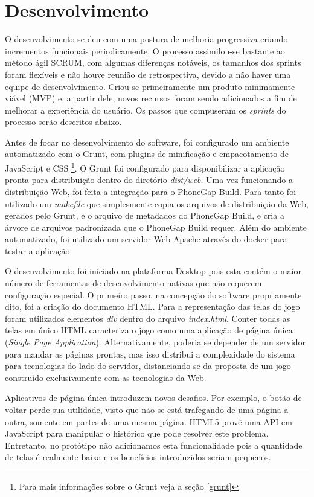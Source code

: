 \section{Desenvolvimento}

O desenvolvimento se deu com uma postura de melhoria progressiva criando
incrementos funcionais periodicamente. O processo assimilou-se bastante
ao método ágil SCRUM, com algumas diferenças notáveis, os tamanhos dos sprints
foram flexíveis e não houve reunião de retrospectiva, devido a não
haver uma equipe de desenvolvimento. Criou-se primeiramente um produto
minimamente viável (MVP) e, a partir dele, novos recursos foram
sendo adicionados a fim de melhorar a experiência do usuário. Os 
passos que compuseram  os \textit{sprints} do processo serão descritos abaixo.

Antes de focar no desenvolvimento do software, foi configurado um ambiente
automatizado com o Grunt, com plugins de minificação e empacotamento
de JavaScript e CSS \footnote{Para mais informações sobre o Grunt
veja a seção \ref{grunt}}. O Grunt foi configurado para disponibilizar a
aplicação pronta para distribuição dentro do diretório \textit{dist/web}.
Uma vez funcionando a distribuição Web, foi feita a integração para
o PhoneGap Build. Para tanto foi utilizado um \textit{makefile} que
simplesmente copia os arquivos de distribuição da Web, gerados pelo
Grunt, e o arquivo de metadados do PhoneGap Build, e cria a árvore de
arquivos padronizada que o PhoneGap Build requer. Além do ambiente
automatizado, foi utilizado um servidor Web Apache através do docker
para testar a aplicação.

O desenvolvimento foi iniciado na plataforma Desktop pois esta contém
o maior número de ferramentas de desenvolvimento nativas que não
requerem configuração especial. O primeiro passo, na concepção
do software propriamente dito, foi a criação do documento HTML.
Para a representação das telas do jogo foram utilizados elementos
\textit{div} dentro do arquivo \textit{index.html}. Conter todas
as telas em único HTML caracteriza o jogo como uma aplicação de
página única (\textit{Single Page Application}). Alternativamente,
poderia se depender de um servidor para mandar as páginas prontas,
mas isso distribui a complexidade do sistema para tecnologias do
lado do servidor, distanciando-se da proposta de um jogo construído
exclusivamente com as tecnologias da Web.

Aplicativos de página única introduzem novos desafios. Por exemplo, o botão
de voltar perde sua utilidade, visto que não se está trafegando
de uma página a outra, somente em partes de uma mesma página. HTML5
provê uma API em JavaScript para manipular o histórico que pode
resolver este problema. Entretanto, no protótipo não adicionamos
esta funcionalidade pois a quantidade de telas é realmente baixa e os
benefícios introduzidos seriam pequenos.

